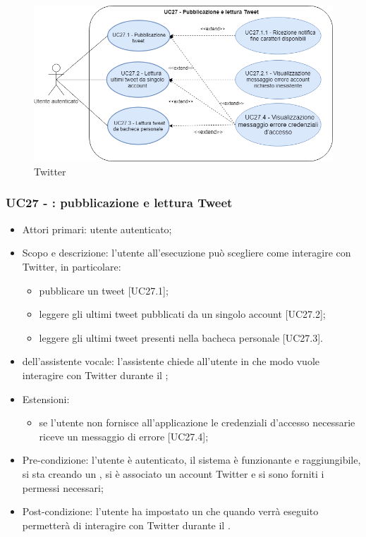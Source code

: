 \begin{figure}[H]
	\centering
	\includegraphics[width=14cm,keepaspectratio]{../includes/pics/connettore_twitter.png}
	\caption{\label{fig:mission} Twitter}
\end{figure}

\subsubsection{UC27 - : pubblicazione e lettura Tweet}
\begin{itemize}
	\item  Attori primari: utente autenticato;
	\item  Scopo e descrizione: l'utente all'esecuzione può scegliere come interagire con Twitter, in particolare:
		   \begin{itemize}
				\item pubblicare un tweet [UC27.1];
				\item leggere gli ultimi tweet pubblicati da un singolo account [UC27.2];
				\item leggere gli ultimi tweet presenti nella bacheca personale [UC27.3].
		   \end{itemize}
	\item  {} dell'assistente vocale: l'assistente chiede all'utente in che modo vuole interagire con Twitter durante il ;
	\item  Estensioni: 
		   \begin{itemize}
				\item se l'utente non fornisce all'applicazione le credenziali d'accesso necessarie riceve un messaggio di errore [UC27.4];
		   \end{itemize}
	\item  Pre-condizione: l'utente è autenticato, il sistema è funzionante e raggiungibile, si sta creando un , si è associato un account Twitter e si sono forniti i permessi necessari;
	\item  Post-condizione: l'utente ha impostato un  che quando verrà eseguito permetterà di interagire con Twitter durante il .
\end{itemize}
